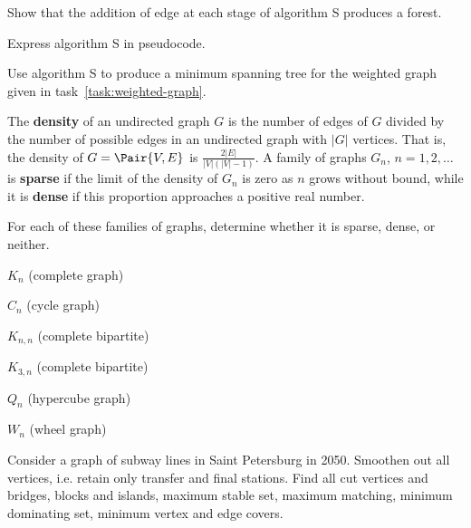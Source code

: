 \documentclass[a4paper,12pt]{article}
\begin{document}
\begin{tasks}
    \begin{subtasks}
        \item Show that the addition of edge at each stage of algorithm S produces a forest.
        \item Express algorithm S in pseudocode.
        \item Use algorithm S to produce a minimum spanning tree for the weighted graph given in task~\ref{task:weighted-graph}.
    \end{subtasks}


    \item The \textbf{density} of an undirected graph $G$ is the number of edges
    of $G$ divided by the number of possible edges in an undirected
    graph with $|G|$ vertices.
    That is, the density of $G = \Pair{V, E}$ is $\frac{2 |E|}{|V| (|V| - 1)}$.
    A family of graphs $G_n$, $n = 1, 2, \dots$ is \textbf{sparse} if the limit of the density of $G_n$ is zero as $n$ grows without bound, while it is \textbf{dense} if this proportion approaches a positive real number.

    For each of these families of graphs, determine whether it is sparse, dense, or neither.

    \begin{multicols}{3}
    \begin{subtasks}
        \item $K_n$ (complete graph)
        \item $C_n$ (cycle graph)
        \item $K_{n,n}$ (complete bipartite)
        \item $K_{3,n}$ (complete bipartite)
        \item $Q_n$ (hypercube graph)
        \item $W_n$ (wheel graph)
    \end{subtasks}
    \end{multicols}


    \item Consider a graph of subway lines in Saint Petersburg in 2050.
    Smoothen out all vertices, i.e. retain only transfer and final stations.
    Find all cut vertices and bridges, blocks and islands, maximum stable set, maximum matching, minimum dominating set, minimum vertex and edge covers.



\end{tasks}
\end{document}
